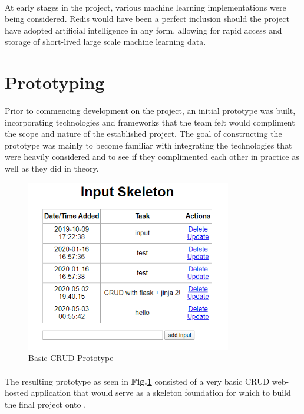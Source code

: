\paragraph{}
At early stages in the project, various machine learning implementations were being considered. Redis would have been a perfect inclusion should the project have adopted artificial intelligence in any form, allowing for rapid access and storage of short-lived large scale machine learning data.

\section{Prototyping}
Prior to commencing development on the project, an initial prototype was built, incorporating technologies and frameworks that the team felt would compliment the scope and nature of the established project. The goal of constructing the prototype was mainly to become familiar with integrating the technologies that were heavily considered and to see if they complimented each other in practice as well as they did in theory.

\begin{figure}[H]
	\caption{Basic CRUD Prototype}
	\label{image:prototype}
	\centering
	\includegraphics[width=0.8\textwidth]{images/prototype.png}
\end{figure}	

\paragraph{}
The resulting prototype as seen in \textbf{Fig.\ref{image:prototype}} consisted of a very basic CRUD web-hosted application that would serve as a skeleton foundation for which to build the final project onto \cite{PROTOTYPE}.

